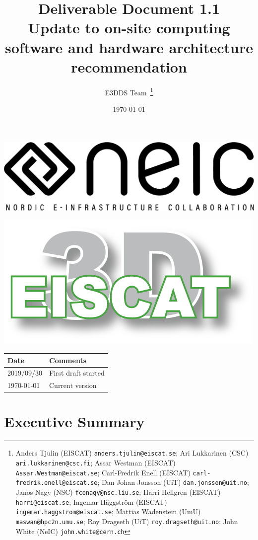 \documentclass[12pt,a4paper]{article}
\title{
{\bf Deliverable Document 1.1} \\
Update to on-site computing software and hardware architecture recommendation}
\author{E3DDS Team~\footnote{
Anders Tjulin (EISCAT) {\tt anders.tjulin@eiscat.se};
Ari Lukkarinen (CSC) {\tt ari.lukkarinen@csc.fi};
Assar Westman (EISCAT) {\tt Assar.Westman@eiscat.se};
Carl-Fredrik Enell (EISCAT) {\tt carl-fredrik.enell@eiscat.se};
Dan Johan Jonsson (UiT) {\tt dan.jonsson@uit.no};
Janos Nagy (NSC) {\tt fconagy@nsc.liu.se};
Harri Hellgren (EISCAT) {\tt harri@eiscat.se};
Ingemar H\"{a}ggstr\"{o}m (EISCAT) {\tt ingemar.haggstrom@eiscat.se};
Mattias Wadenstein (UmU) {\tt maswan@hpc2n.umu.se};
Roy Dragseth (UiT) {\tt roy.dragseth@uit.no};
John White (NeIC) {\tt john.white@cern.ch}}}
\date{\today}
\begin{document}
\pagestyle{fancy}

\maketitle
\par\noindent
\begin{minipage}{0.45\textwidth}
  \includegraphics[scale=0.18]{NEIC_logo_screen_black.pdf}
\end{minipage}
\begin{minipage}{0.45\textwidth}
  \hfill
  \includegraphics[width=0.75\linewidth]{e3d-logo-green-500px}
\end{minipage}

\begin{center}
\begin{tabular}{|l|l|} \hline
\large \bf Date & \large \bf Comments \\ \hline
\large 2019/09/30 & First draft started \\ \hline
\large \today  & Current version\\ \hline
\end{tabular}
\end{center}

\newpage
\tableofcontents
\newpage


\section{Executive Summary} \label{exec-summ}
\end{document}

